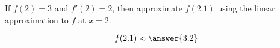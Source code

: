\documentclass{ximera}
\author{Steven Gubkin}
\begin{document}
\begin{exercise}
If $f(2)=3$ and $f'(2) = 2$, then approximate $f(2.1)$ using the
linear approximation to $f$ at $x=2$.

\begin{prompt}
  $$f(2.1) \approx \answer{3.2}$$
\end{prompt}

\end{exercise}
\end{document}
